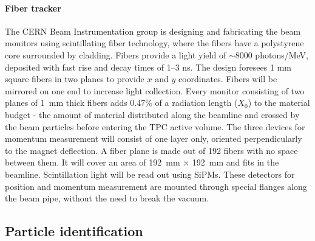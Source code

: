 \paragraph{Fiber tracker}
The CERN Beam Instrumentation group is designing and fabricating
 the beam monitors %
 using scintillating fiber technology, where %
 the fibers have a polystyrene core surrounded by cladding. Fibers provide a light yield of $\sim$8000 photons/MeV, deposited with fast rise and decay times of 1--3 ns. The design foresees 1 mm square fibers in two planes to provide $x$ and $y$ coordinates. Fibers will be mirrored on one end to increase
light collection.  Every monitor consisting of two planes of 1~mm thick fibers adds 0.47\% of a radiation length ($X_0$) to the material budget - the amount of material distributed along the beamline and crossed by the beam particles before entering the TPC active volume. 
The three devices for momentum measurement will consist of one layer only, oriented perpendicularly to the magnet deflection.
A fiber plane is made out of 192 fibers with no space between them. It will cover an area of 192~mm $\times$ 192~mm and fits in the beamline.
Scintillation light will be read out using SiPMs.
%
These detectors for position and momentum measurement are 
mounted through special flanges along the beam pipe, without the need to break the vacuum.


\subsection{Particle identification}

